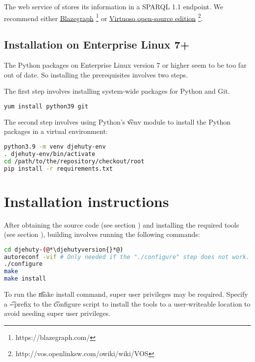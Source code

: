 
  The web service of  stores its information in a SPARQL 1.1
  \citep{sparql-11} endpoint.  We recommend either
  \href{https://blazegraph.com/}{Blazegraph}%
  \footnote{https://blazegraph.com/}
  or \href{http://vos.openlinksw.com/owiki/wiki/VOS}%
  {Virtuoso open-source edition}%
  \footnote{http://vos.openlinksw.com/owiki/wiki/VOS}.

\subsection{Installation on Enterprise Linux 7+}

  The Python packages on Enterprise Linux version 7 or higher seem to
  be too far out of date.  So installing the prerequisites involves
  two steps.

  The first step involves installing system-wide packages for Python and Git.

\begin{lstlisting}[language=bash]
yum install python39 git
\end{lstlisting}

  The second step involves using Python's \t{venv} module to
  install the Python packages in a virtual environment:

\begin{lstlisting}[language=bash]
python3.9 -m venv djehuty-env
. djehuty-env/bin/activate
cd /path/to/the/repository/checkout/root
pip install -r requirements.txt
\end{lstlisting}

\section{Installation instructions}

  After obtaining the source code (see section )
  and installing the required tools (see section ),
  building involves running the following commands:

\begin{lstlisting}[language=bash]
cd djehuty-(@*\djehutyversion{}*@)
autoreconf -vif # Only needed if the "./configure" step does not work.
./configure
make
make install
\end{lstlisting}

  To run the \t{make install} command, super user privileges may be
  required.  Specify a \t{-{}-prefix} to the \t{configure}
  script to install the tools to a user-writeable location to avoid
  needing super user privileges.

